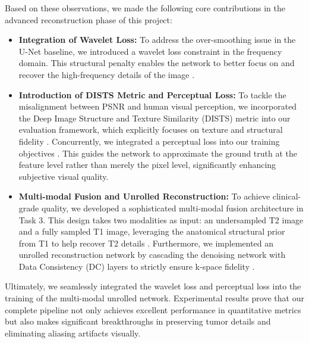 Based on these observations, we made the following core contributions in the advanced reconstruction phase of this project:
\begin{itemize}
    \item \textbf{Integration of Wavelet Loss:} To address the over-smoothing issue in the U-Net baseline, we introduced a wavelet loss constraint in the frequency domain. This structural penalty enables the network to better focus on and recover the high-frequency details of the image \cite{kang2018deep}.
    \item \textbf{Introduction of DISTS Metric and Perceptual Loss:} To tackle the misalignment between PSNR and human visual perception, we incorporated the Deep Image Structure and Texture Similarity (DISTS) metric into our evaluation framework, which explicitly focuses on texture and structural fidelity \cite{ding2020image}. Concurrently, we integrated a perceptual loss into our training objectives \cite{johnson2016perceptual}. This guides the network to approximate the ground truth at the feature level rather than merely the pixel level, significantly enhancing subjective visual quality.
    \item \textbf{Multi-modal Fusion and Unrolled Reconstruction:} To achieve clinical-grade quality, we developed a sophisticated multi-modal fusion architecture in Task 3. This design takes two modalities as input: an undersampled T2 image and a fully sampled T1 image, leveraging the anatomical structural prior from T1 to help recover T2 details \cite{zhou2020dudornet}. Furthermore, we implemented an unrolled reconstruction network by cascading the denoising network with Data Consistency (DC) layers to strictly ensure k-space fidelity \cite{schlemper2017deep}.
\end{itemize}

Ultimately, we seamlessly integrated the wavelet loss and perceptual loss into the training of the multi-modal unrolled network. Experimental results prove that our complete pipeline not only achieves excellent performance in quantitative metrics but also makes significant breakthroughs in preserving tumor details and eliminating aliasing artifacts visually.




